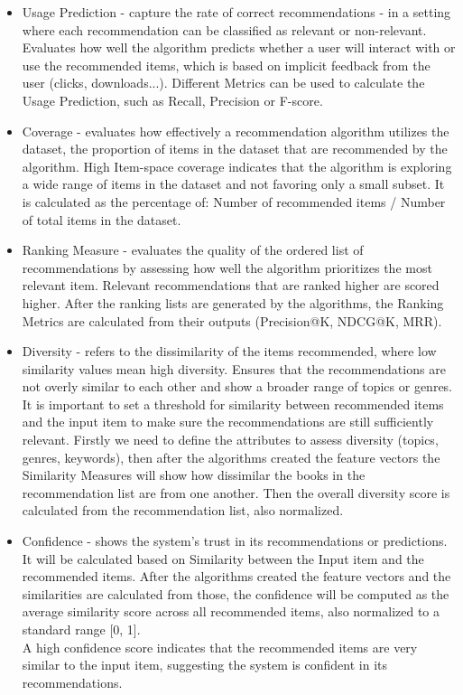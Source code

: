 \documentclass[\myFontSize,oneside,english,hidelinks,a4paper]{article}
\begin{document}
\begin{itemize}

\item Usage Prediction - capture the rate of correct recommendations - in a setting where each recommendation can be classified as relevant or non-relevant. Evaluates how well the algorithm predicts whether a user will interact with or use the recommended items, which is based on implicit feedback from the user (clicks, downloads...). Different Metrics can be used to calculate the Usage Prediction, such as Recall, Precision or F-score.

\item Coverage - evaluates how effectively a recommendation algorithm utilizes the dataset, the proportion of items in the dataset that are recommended by the algorithm. High Item-space coverage indicates that the algorithm is exploring a wide range of items in the dataset and not favoring only a small subset. It is calculated as the percentage of: Number of recommended items / Number of total items in the dataset.

\item Ranking Measure - evaluates the quality of the ordered list of recommendations by assessing how well the algorithm prioritizes the most relevant item. Relevant recommendations that are ranked higher are scored higher. After the ranking lists are generated by the algorithms, the Ranking Metrics are calculated from their outputs (Precision@K, NDCG@K, MRR).

\item Diversity - refers to the dissimilarity of the items recommended, where low similarity values mean high diversity. Ensures that the recommendations are not overly similar to each other and show a broader range of topics or genres. It is important to set a threshold for similarity between recommended items and the input item to make sure the recommendations are still sufficiently relevant. Firstly we need to define the attributes to assess diversity (topics, genres, keywords), then after the algorithms created the feature vectors the Similarity Measures will show how dissimilar the books in the recommendation list are from one another. Then the overall diversity score is calculated from the recommendation list, also normalized.

\item Confidence - shows the system's trust in its recommendations or predictions. It will be calculated based on Similarity between the Input item and the recommended items. After the algorithms created the feature vectors and the similarities are calculated from those, the confidence will be computed as the average similarity score across all recommended items, also normalized to a standard range [0, 1].\\
A high confidence score indicates that the recommended items are very similar to the input item, suggesting the system is confident in its recommendations.


\end{itemize}
\end{document}
